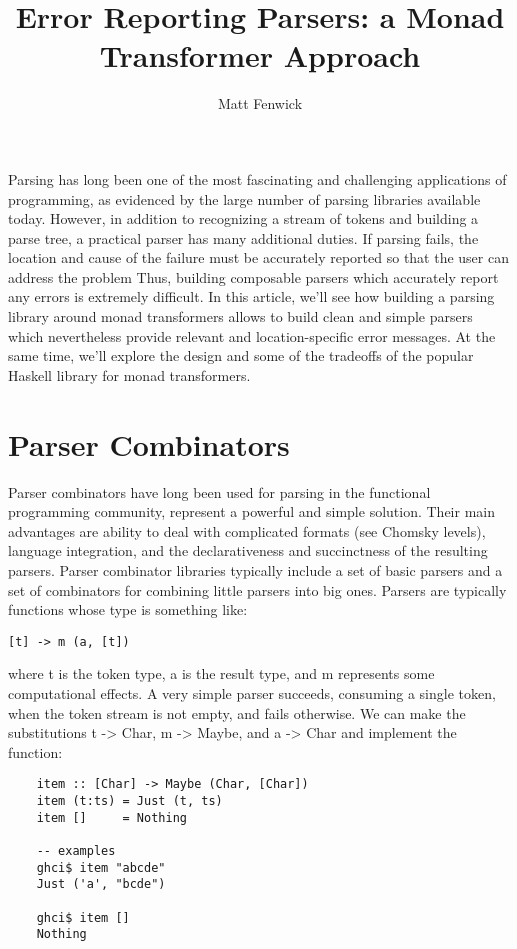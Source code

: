 \documentclass{tmr}
\title{Error Reporting Parsers:  a Monad Transformer Approach}
\author{Matt Fenwick\email{mfenwick100@gmail.com}}
\begin{document}
\begin{introduction}
Parsing has long been one of the most fascinating and challenging applications
of programming, as evidenced by the large number of parsing libraries available
today.  However, in addition to recognizing a stream of tokens and building a parse
tree, a practical parser has many additional duties.  If parsing fails,
the location and cause of the failure must be accurately reported so that
the user can address the problem
Thus, building composable parsers which accurately report any errors
is extremely difficult.  In this article, we'll see how building
a parsing library around monad transformers allows to build clean and simple 
parsers which nevertheless provide relevant and location-specific error messages.
At the same time, we'll explore the design and some of the tradeoffs of the 
popular Haskell library for monad transformers.
\end{introduction}


\section{Parser Combinators}
Parser combinators have long been used for parsing in the 
functional programming community, represent a powerful and simple solution.
Their main advantages are ability to deal with complicated formats (see
Chomsky levels), language integration, and the declarativeness and
succinctness of the resulting parsers.
Parser combinator libraries typically include a set of basic parsers and a
set of combinators for combining little parsers into big ones.  Parsers are
typically functions whose type is something like:
\begin{verbatim}
[t] -> m (a, [t])
\end{verbatim}
where t is the token type, a is the result type, and m represents some
computational effects.
A very simple parser succeeds, consuming a single token, when the token stream
is not empty, and fails otherwise.  We can make the substitutions t -> Char,
m -> Maybe, and a -> Char and implement the function:
\begin{verbatim}
    item :: [Char] -> Maybe (Char, [Char])
    item (t:ts) = Just (t, ts)
    item []     = Nothing
    
    -- examples
    ghci$ item "abcde"
    Just ('a', "bcde")
    
    ghci$ item []
    Nothing
\end{verbatim}
\end{document}
